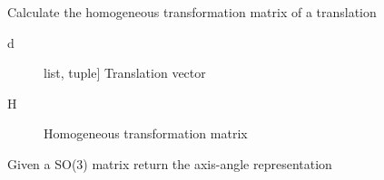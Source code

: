 \documentclass[letterpaper,10pt,english]{sphinxmanual}
\begin{document}
\begin{fulllineitems}
\label{\detokenize{_src/didactic:rkd.didactic.transformations.htmtra}}
Calculate the homogeneous transformation matrix of a translation
\begin{description}
\item[{d}] \leavevmode{[}list, tuple{]}
Translation vector

\end{description}
\begin{description}
\item[{H}] \leavevmode{[}\sphinxcode{\sphinxupquote{sympy.matrices.dense.MutableDenseMatrix}}{]}
Homogeneous transformation matrix

\end{description}

%
\begin{sphinxVerbatim}[commandchars=\\\{\}]
\PYG{p}{[}\PYG{p}{]}
\end{sphinxVerbatim}

%
\begin{sphinxVerbatim}[commandchars=\\\{\}]
  
\PYG{p}{[}\PYG{p}{]}
\end{sphinxVerbatim}

\end{fulllineitems}


\begin{fulllineitems}
\label{\detokenize{_src/didactic:rkd.didactic.transformations.rot2axa}}
Given a SO(3) matrix return the axis-angle representation

\end{fulllineitems}
\end{document}

